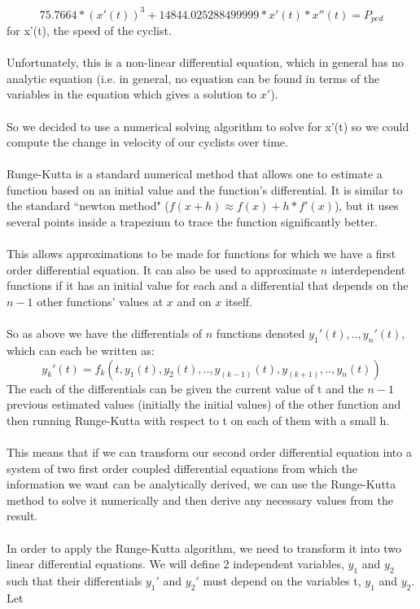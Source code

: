 \documentclass[10pt, a4paper]{report}
\begin{document}
$$ 75.7664 *(x'(t))^{3} + 14844.025288499999 * x'(t) * x''(t) = P_{ped}$$
for x'(t), the speed of the cyclist. \\\\
Unfortunately, this is a non-linear differential equation, which in general has no analytic equation (i.e. in general, no equation can be found in terms of the variables in the equation which gives a solution to $x'$).\\\\
So we decided to use a numerical solving algorithm to solve for x'(t) so we could compute the change in velocity of our cyclists over time.\\\\
Runge-Kutta is a standard numerical method that allows one to estimate a function based on an initial value and the function's differential. It is similar to the standard ``newton method" ($f(x + h) \approx f(x) + h*f'(x)$), but it uses several points inside a trapezium to trace the function significantly better. \\\\
This allows approximations to be made for functions for which we have a first order differential equation. It can also be used to approximate $n$ interdependent functions if it has an initial value for each and a differential that depends on the $n - 1$ other functions' values at $x$ and on $x$ itself.\\\\
So as above we have the differentials of $n$ functions denoted $y_1'(t),..,y_n'(t)$, which can each be written as: 
$$y_k'(t) = f_k(t,y_1(t),y_2(t),..,y_{(k-1)}(t),y_{(k+1)},..,y_n(t))$$
The each of the differentials can be given the current value of t and the $n - 1$ previous estimated values (initially the initial values) of the other function and then running Runge-Kutta with respect to t on each of them with a small h. \\\\
This means that if we can transform our second order differential equation into a system of two first order coupled differential equations from which the information we want can be analytically derived, we can use the Runge-Kutta method to solve it numerically and then derive any necessary values from the result. \\\\
In order to apply the Runge-Kutta algorithm, we need to transform it into two linear differential equations. We will define 2 independent variables, $y_1$ and $y_2$ such that their differentials $y_1'$ and $y_2'$ must depend on the variables t, $y_1$ and $y_2$. Let
\end{document}
